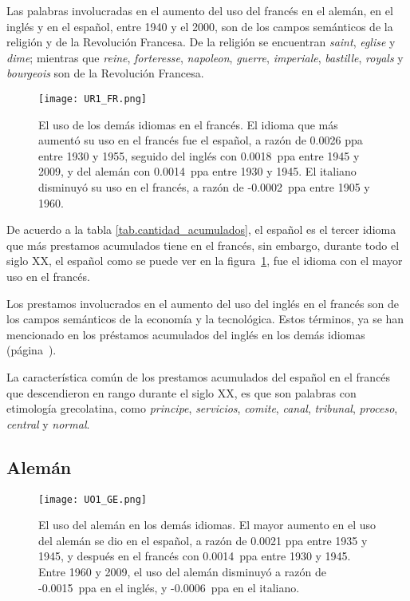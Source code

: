 Las palabras involucradas en el aumento del uso del francés en el alemán, en el inglés y en el español, entre 1940 y el 2000, son de los campos semánticos de la religión y de la Revolución Francesa. De la religión se encuentran \textit{saint}, \textit{eglise} y \textit{dime}; mientras que \textit{reine}, \textit{forteresse}, \textit{napoleon}, \textit{guerre}, \textit{imperiale}, \textit{bastille}, \textit{royals} y \textit{bourgeois} son de la Revolución Francesa. 
\label{FR-D}


\begin{figure}[h!]
	\centering
	\texttt{[image: UR1\_FR.png]}
	\caption{El uso de los demás idiomas en el francés. El idioma que más aumentó su uso en el francés fue el español, a razón de  0.0026 ppa entre 1930 y 1955, seguido del inglés con 0.0018~ppa entre 1945 y 2009, y del alemán con 0.0014~ppa entre 1930 y 1945. El italiano  disminuyó su uso en el francés, a razón de -0.0002~ppa entre 1905 y 1960.}
	\label{fig.UR_FR}
\end{figure}
		
De acuerdo a la tabla \ref{tab.cantidad_acumulados},  el español es el tercer idioma que más prestamos acumulados tiene en el francés, sin embargo, durante todo el siglo XX, el español como se puede ver en la figura~\ref{fig.UR_FR}, fue el idioma con el mayor uso en el francés.

Los prestamos involucrados en el aumento del uso del inglés en el francés son de los campos semánticos de la economía y la tecnológica. Estos términos, ya se han mencionado en los préstamos acumulados del inglés en los demás idiomas (página~\pageref{EN-D}).
	
La característica común de los prestamos acumulados del español en el francés que descendieron en rango durante el siglo XX, es que son palabras con etimología grecolatina,  como \textit{principe}, \textit{servicios}, \textit{comite}, \textit{canal}, \textit{tribunal}, \textit{proceso}, \textit{central} y \textit{normal}. 
\label{D-FR}



\subsection{Alemán} %

\begin{figure}[h!]
	\centering
	\texttt{[image: UO1\_GE.png]}
	\caption{El uso del alemán en los demás idiomas. El mayor aumento en el uso del alemán se dio en el español, a razón de 0.0021 ppa entre 1935 y 1945, y después en el francés con 0.0014~ppa entre 1930 y 1945.  Entre 1960 y 2009, el uso del alemán disminuyó  a razón de -0.0015~ppa en el inglés, y -0.0006~ppa en el italiano.}
	\label{fig.UO_GE}

\end{figure}



